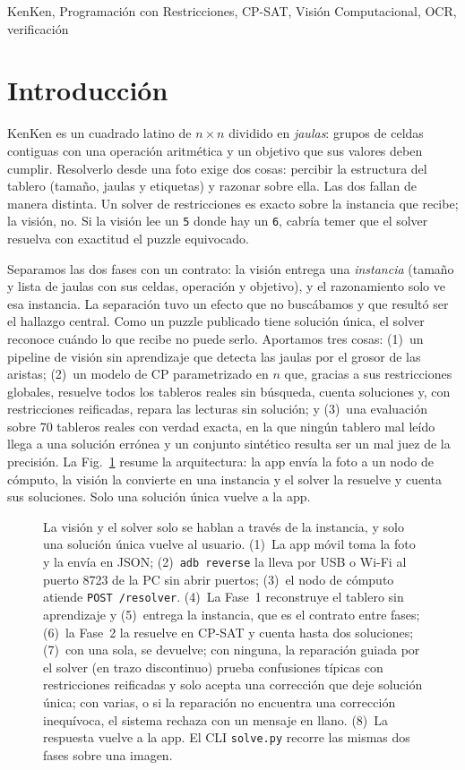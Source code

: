 \documentclass[conference]{IEEEtran}
\begin{document}
\begin{IEEEkeywords}
KenKen, Programación con Restricciones, CP-SAT, Visión Computacional, OCR, verificación
\end{IEEEkeywords}

\section{Introducción}
KenKen es un cuadrado latino de $n \times n$ dividido en \emph{jaulas}: grupos de celdas contiguas con una operación aritmética y un objetivo que sus valores deben cumplir. Resolverlo desde una foto exige dos cosas: percibir la estructura del tablero (tamaño, jaulas y etiquetas) y razonar sobre ella. Las dos fallan de manera distinta. Un solver de restricciones es exacto sobre la instancia que recibe; la visión, no. Si la visión lee un \texttt{5} donde hay un \texttt{6}, cabría temer que el solver resuelva con exactitud el puzzle equivocado.

Separamos las dos fases con un contrato: la visión entrega una \emph{instancia} (tamaño y lista de jaulas con sus celdas, operación y objetivo), y el razonamiento solo ve esa instancia. La separación tuvo un efecto que no buscábamos y que resultó ser el hallazgo central. Como un puzzle publicado tiene solución única, el solver reconoce cuándo lo que recibe no puede serlo. Aportamos tres cosas: (1)~un pipeline de visión sin aprendizaje que detecta las jaulas por el grosor de las aristas; (2)~un modelo de CP parametrizado en $n$ que, gracias a sus restricciones globales, resuelve todos los tableros reales sin búsqueda, cuenta soluciones y, con restricciones reificadas, repara las lecturas sin solución; y (3)~una evaluación sobre 70 tableros reales con verdad exacta, en la que ningún tablero mal leído llega a una solución errónea y un conjunto sintético resulta ser un mal juez de la precisión.
La Fig.~\ref{fig:arquitectura} resume la arquitectura: la app envía la foto a un nodo de cómputo, la visión la convierte en una instancia y el solver la resuelve y cuenta sus soluciones. Solo una solución única vuelve a la app.

\begin{figure}[t]
\centering
\resizebox{\textwidth}{!}{}
\caption{La visión y el solver solo se hablan a través de la instancia, y solo una solución única vuelve al usuario. (1)~La app móvil toma la foto y la envía en JSON; (2)~\texttt{adb reverse} la lleva por USB o Wi-Fi al puerto 8723 de la PC sin abrir puertos; (3)~el nodo de cómputo atiende \texttt{POST /resolver}. (4)~La Fase~1 reconstruye el tablero sin aprendizaje y (5)~entrega la instancia, que es el contrato entre fases; (6)~la Fase~2 la resuelve en CP-SAT y cuenta hasta dos soluciones; (7)~con una sola, se devuelve; con ninguna, la reparación guiada por el solver (en trazo discontinuo) prueba confusiones típicas con restricciones reificadas y solo acepta una corrección que deje solución única; con varias, o si la reparación no encuentra una corrección inequívoca, el sistema rechaza con un mensaje en llano. (8)~La respuesta vuelve a la app. El CLI \texttt{solve.py} recorre las mismas dos fases sobre una imagen.}
\label{fig:arquitectura}
\end{figure}
\end{document}

